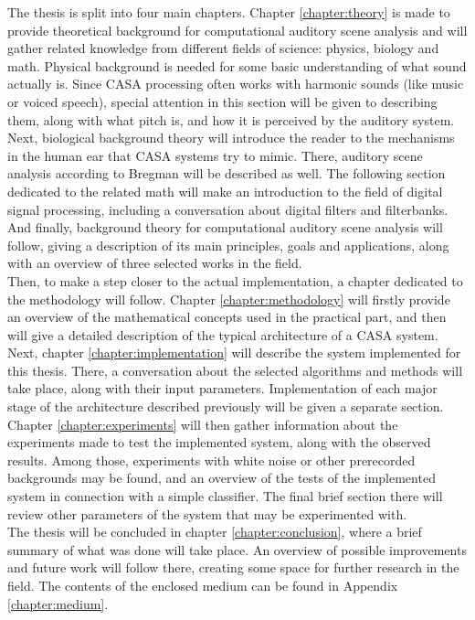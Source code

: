The thesis is split into four main chapters. Chapter \ref{chapter:theory} is made to provide theoretical background for computational auditory scene analysis and will gather related knowledge from dif\-fer\-ent fields of science: physics, biology and math. Physical background is needed for some basic understanding of what sound actually is. Since CASA processing often works with harmonic sounds (like music or voiced speech), special attention in this section will be given to describing them, along with what pitch is, and how it is perceived by the auditory system. Next, biological background theory will introduce the reader to the mechanisms in the human ear that CASA systems try to mimic. There, auditory scene analysis according to Bregman will be described as well. The following section dedicated to the related math will make an introduction to the field of digital signal processing, including a conversation about digital filters and filterbanks. And finally, background theory for computational auditory scene analysis will follow, giving a description of its main principles, goals and applications, along with an overview of three selected works in the field.\\

Then, to make a step closer to the actual implementation, a chapter dedicated to the metho\-dology will follow. Chapter \ref{chapter:methodology} will firstly provide an overview of the mathematical concepts used in the practical part, and then will give a detailed description of the typical architecture of a CASA system.\\

Next, chapter \ref{chapter:implementation} will describe the system implemented for this thesis. There, a conversation about the selected algorithms and methods will take place, along with their input parameters. Implementation of each major stage of the architecture described previously will be given a separate section.\\

Chapter \ref{chapter:experiments} will then gather information about the experiments made to test the implemented system, along with the observed results. Among those, experiments with white noise or other prerecorded backgrounds may be found, and an overview of the tests of the implemented system in connection with a simple classifier. The final brief section there will review other parameters of the system that may be experimented with.\\

The thesis will be concluded in chapter \ref{chapter:conclusion}, where a brief summary of what was done will take place. An overview of possible improvements and future work will follow there, creating some space for further research in the field. The contents of the enclosed medium can be found in Appendix \ref{chapter:medium}.\\
